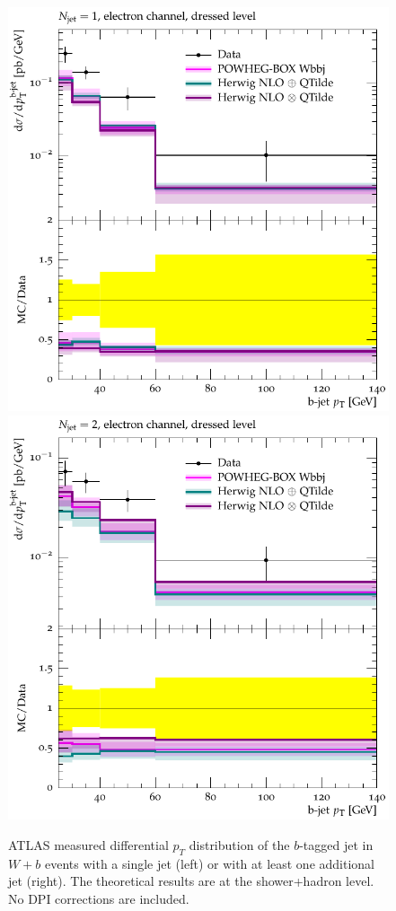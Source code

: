 \documentclass[11pt]{cernrep}
\newcommand{\pt}{\ensuremath{p_{T}}\xspace}
\begin{document}
\begin{figure}[htbp]
\begin{center}
   \includegraphics[scale=0.65]{figs/wbb/compared/d02-x01-y01.pdf}
   \includegraphics[scale=0.65]{figs/wbb/compared/d02-x02-y01.pdf}
\end{center}
\caption{ATLAS measured differential \pt distribution of the $b$-tagged jet in $W+b$ events with a
  single jet (left) or with at least one additional jet (right). The theoretical results
  are at the shower+hadron level. No DPI corrections are included.}
\label{fig:wbb-pt}
\end{figure}
\end{document}
